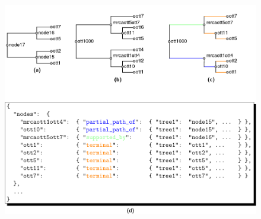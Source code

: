 \documentclass[fleqn,12pt,lineno,english]{wlpeerj}
\providecommand{\DIFaddbeginFL}{} %
\providecommand{\DIFaddendFL}{} %
\providecommand{\DIFdelendFL}{} %
\begin{document}
\begin{figure}








\DIFdelendFL \DIFaddbeginFL \includegraphics[width=1.0\textwidth]{Fig13}  
\DIFaddendFL 


\end{figure}
\end{document}
